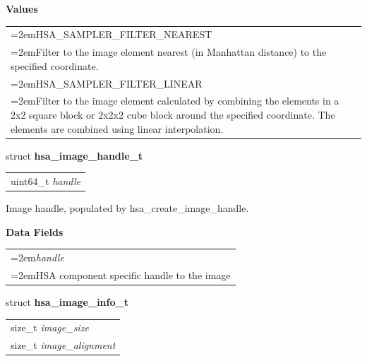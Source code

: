 \documentclass{book}
\newcommand{\hsaarg}[1]{\textit{#1}}
\newcommand{\hsadef}[2]{\hypertarget{#1}{\textbf{#2}}}
\newcommand{\hsatyp}[2]{\hypertarget{#1}{#2}}
\begin{document}
\begin{appendices}
\noindent\textbf{Values}\\[-5mm]
\begin{longtable}{@{}>{\hangindent=2em}p{\linewidth}}
HSA\_SAMPLER\_FILTER\_NEAREST \\\hspace{2em}Filter to the image element nearest (in Manhattan distance) to the specified coordinate.\\[2mm]
HSA\_SAMPLER\_FILTER\_LINEAR \\\hspace{2em}Filter to the image element calculated by combining the elements in a 2x2 square block or 2x2x2 cube block around the specified coordinate. The elements are combined using linear interpolation.
\end{longtable}

\noindent\begin{tcolorbox}[nobeforeafter,arc=0mm,colframe=white,colback=lightgray,left=0mm]
struct \hsadef{group__API__images_1ga0aeecea8e818df4cec2eccb3a5e85d5f}{hsa\_image\_handle\_t} \\
\begin{tabular}{@{}l}
\hspace{1.7em}uint64\_t \hsaarg{handle}
\end{tabular}

\end{tcolorbox}
Image handle, populated by \hsatyp{group__API__images_1ga632e1065ecb2c9dcfe69c0e550396873}{hsa\_create\_image\_handle}.

\noindent\textbf{Data Fields}\\[-5mm]
\begin{longtable}{@{}>{\hangindent=2em}p{\textwidth}}
\hsaarg{handle}\\\hspace{2em}HSA component specific handle to the image
\end{longtable}



\noindent\begin{tcolorbox}[nobeforeafter,arc=0mm,colframe=white,colback=lightgray,left=0mm]
struct \hsadef{group__API__images_1ga8b226310d50050b6a9ad73c91ee6eca2}{hsa\_image\_info\_t} \\
\begin{tabular}{@{}l}
\hspace{1.7em}size\_t \hsaarg{image\_size}\\
\hspace{1.7em}size\_t \hsaarg{image\_alignment}
\end{tabular}


\end{tcolorbox}
\end{appendices}
\end{document}
